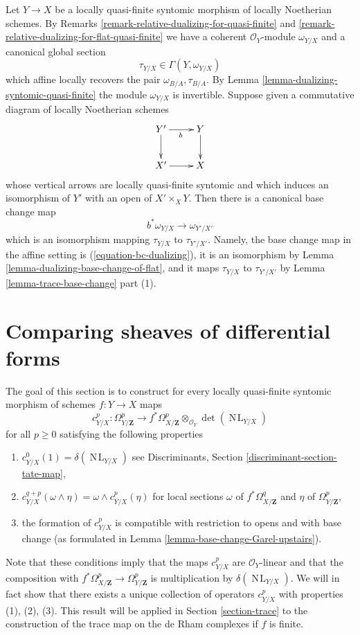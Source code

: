 \documentclass[10pt,a4paper]{amsart}
\theoremstyle{plain}
\theoremstyle{definition}
\theoremstyle{remark}
\numberwithin{equation}{subsection}
\def\NL{\mathop{N\!L}\nolimits}
\begin{document}
\noindent
Let $Y \to X$ be a locally quasi-finite syntomic morphism of
locally Noetherian schemes. By
Remarks \ref{remark-relative-dualizing-for-quasi-finite} and
\ref{remark-relative-dualizing-for-flat-quasi-finite} we have
a coherent $\mathcal{O}_Y$-module $\omega_{Y/X}$ and a canonical
global section
$$
\tau_{Y/X} \in \Gamma(Y, \omega_{Y/X})
$$
which affine locally recovers the pair $\omega_{B/A}, \tau_{B/A}$.
By Lemma \ref{lemma-dualizing-syntomic-quasi-finite} the module
$\omega_{Y/X}$ is invertible. Suppose given a commutative diagram of
locally Noetherian schemes
$$
\xymatrix{
Y' \ar[r]_b \ar[d] & Y \ar[d] \\
X' \ar[r] & X
}
$$
whose vertical arrows are locally quasi-finite syntomic and which
induces an isomorphism of $Y'$ with an open of $X' \times_X Y$.
Then there is a canonical base change map
$$
b^*\omega_{Y/X} \longrightarrow \omega_{Y'/X'}
$$
which is an isomorphism
mapping $\tau_{Y/X}$ to $\tau_{Y'/X'}$. Namely, the base change map
in the affine setting is (\ref{equation-bc-dualizing}), it is an
isomorphism by Lemma \ref{lemma-dualizing-base-change-of-flat}, and it
maps $\tau_{Y/X}$ to $\tau_{Y'/X'}$ by
Lemma \ref{lemma-trace-base-change} part (1).

\section{Comparing sheaves of differential forms}
\label{section-quasi-finite-syntomic}

\noindent
The goal of this section is to construct for every locally quasi-finite
syntomic morphism of schemes $f : Y \to X$ maps
$$
c^p_{Y/X} :
\Omega^p_{Y/\mathbf{Z}}
\longrightarrow
f^*\Omega^p_{X/\mathbf{Z}} \otimes_{\mathcal{O}_Y} \det(\NL_{Y/X})
$$
for all $p \geq 0$ satisfying the following properties
\begin{enumerate}
\item
\label{item-degree-zero}
$c_{Y/X}^0(1) = \delta(\NL_{Y/X})$ see
Discriminants, Section \ref{discriminant-section-tate-map},
\item
\label{item-multiplicative}
$c_{Y/X}^{q + p}(\omega \wedge \eta) = \omega \wedge c_{Y/X}^p(\eta)$
for local sections $\omega$ of $f^*\Omega^q_{X/\mathbf{Z}}$
and $\eta$ of $\Omega^p_{Y/\mathbf{Z}}$,
\item
\label{item-base-change}
the formation of $c^p_{Y/X}$ is compatible with restriction to opens
and with base change
(as formulated in Lemma \ref{lemma-base-change-Garel-upstairs}).
\end{enumerate}
Note that these conditions imply that the maps $c^p_{Y/X}$ are
$\mathcal{O}_Y$-linear and that the composition with
$f^*\Omega^p_{X/\mathbf{Z}} \to \Omega^p_{Y/\mathbf{Z}}$
is multiplication by $\delta(\NL_{Y/X})$.
We will in fact show that there exists a unique collection of operators
$c^p_{Y/X}$ with properties (1), (2), (3). This result will be applied in
Section \ref{section-trace} to the construction of the trace map on
the de Rham complexes if $f$ is finite.
\end{document}
